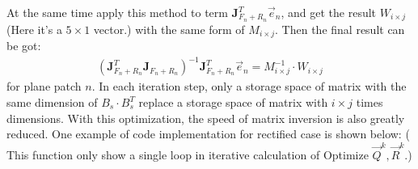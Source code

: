 At the same time apply this method to term $\mathbf{J}_{F_n+R_n}^{T} \vec{e}_{n}$, and get the result $W_{i\times j}$ (Here it's a $5 \times 1$ vector.) with the same form of $M_{i \times j}$. Then the final result can be got:
\begin{align}
		\left(\mathbf{J}_{F_n+R_n}^{T} \mathbf{J}_{F_n+R_n} \right)^{-1} \mathbf{J}_{F_n+R_n}^{T} \vec{e}_{n} = M_{i \times j}^{-1} \cdot W_{i\times j}
\end{align}
for plane patch $n$. In each iteration step, only a storage space of matrix with the same dimension of $B_{s} \cdot B_{s}^T$ replace a storage space of matrix with $i \times j$ times dimensions. With this optimization, the speed of matrix inversion is also greatly reduced. One example of code implementation for rectified case is shown below: ( This function only show a single loop in iterative calculation of Optimize $\vec{Q}^k, \vec{R}^k$.)
